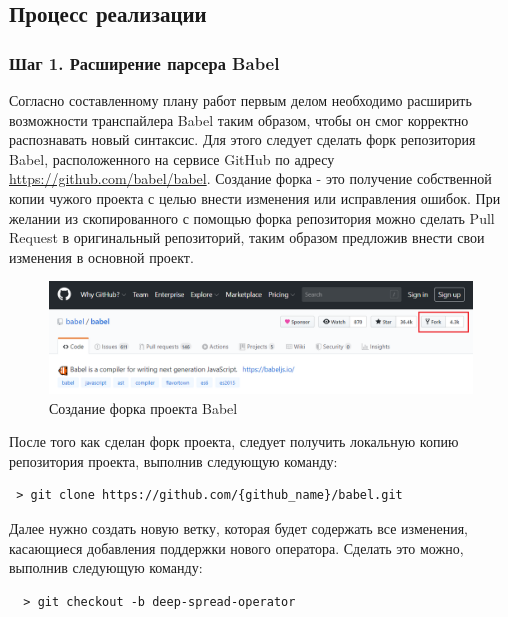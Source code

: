 \documentclass[14pt, a4paper]{article}
\def\code#1{\texttt{#1}} %
\begin{document}
\subsection{Процесс реализации}
\subsubsection*{Шаг 1. Расширение парсера Babel}
Согласно составленному плану работ первым делом необходимо расширить возможности транспайлера Babel таким образом,
чтобы он смог корректно распознавать новый синтаксис. Для этого следует сделать форк репозитория Babel,
расположенного на сервисе GitHub по адресу \url{https://github.com/babel/babel}. Создание форка - это
получение собственной копии чужого проекта с целью внести изменения или исправления ошибок. При желании
из скопированного с помощью форка репозитория можно сделать Pull Request в оригинальный репозиторий,
таким образом предложив внести свои изменения в основной проект.
\begin{figure}[h!]
  \centering
  \includegraphics[scale=0.55]{img/babel_fork.PNG}
  \caption{Создание форка проекта Babel}
  \label{babel_fork}
\end{figure}

После того как сделан форк проекта, следует получить локальную копию репозитория проекта, выполнив следующую команду:
\begin{lstlisting}
 > git clone https://github.com/{github_name}/babel.git
\end{lstlisting}

Далее нужно создать новую ветку, которая будет содержать все изменения, касающиеся добавления поддержки нового оператора.
Сделать это можно, выполнив следующую команду:
\begin{lstlisting}
  > git checkout -b deep-spread-operator
\end{lstlisting}

\end{document}
